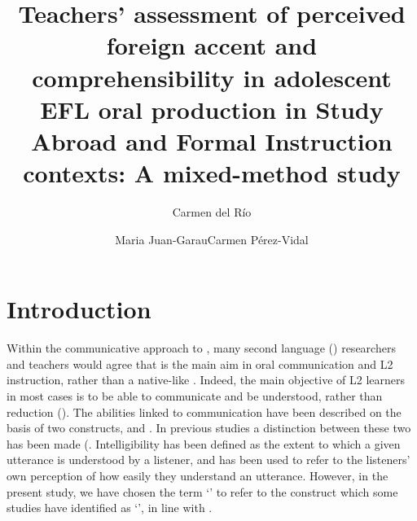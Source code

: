 \documentclass[output=paper]{langsci/langscibook}
\author{Carmen del Río\affiliation{Universitat Pompeu Fabra}\and Maria Juan-Garau\affiliation{University of the Balearic Islands}\lastand Carmen Pérez-Vidal\affiliation{Universitat Pompeu Fabra}}
\title{Teachers’ assessment of perceived foreign accent and comprehensibility in adolescent EFL oral production in Study Abroad and Formal Instruction contexts: A mixed-method study}
\begin{document}
\section{Introduction}

Within the communicative approach to , many second language () researchers and teachers would agree that  is the main aim in oral communication and {L2}  instruction, rather than a native-like . Indeed, the main objective of {L2} learners in most cases is to be able to communicate and be understood, rather than  reduction (\citealt{PenningtonRichards1986,DerwingMunro1997,Jenkins2000,Munro2008}). The abilities linked to communication have been described on the basis of two constructs,  and . In previous studies a distinction between these two has been made (\citealt{MunroDerwing1995,MunroDerwing1999,DerwingMunro1997,DerwingMunro2009}. Intelligibility has been defined as the extent to which a given utterance is understood by a listener, and  has been used to refer to the listeners’ own perception of how easily they understand an utterance. However, in the present study, we have chosen the term ‘’ to refer to the construct which some studies have identified as ‘’, in line with \citet{IsaacsTrofimovich2012}.  
\end{document}
